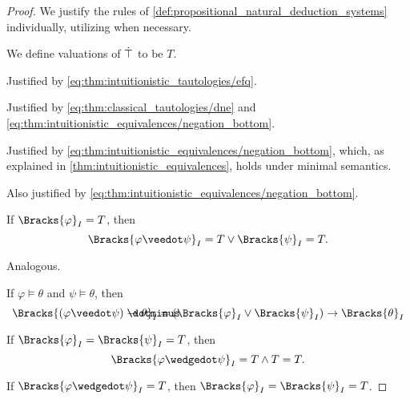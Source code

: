 \begin{proof}
  We justify the rules of \cref{def:propositional_natural_deduction_systems} individually, utilizing  when necessary.

   We define valuations of \( \dot{\top} \) to be \( T \).

   Justified by \eqref{eq:thm:intuitionistic_tautologies/efq}.

   Justified by \eqref{eq:thm:classical_tautologies/dne} and \eqref{eq:thm:intuitionistic_equivalences/negation_bottom}.

   Justified by \eqref{eq:thm:intuitionistic_equivalences/negation_bottom}, which, as explained in \cref{thm:intuitionistic_equivalences}, holds under minimal semantics.

   Also justified by \eqref{eq:thm:intuitionistic_equivalences/negation_bottom}.

   If \( \Bracks{\varphi}_I = T \), then
  \begin{equation*}
    \Bracks{\varphi \synvee \psi}_I = T \vee \Bracks{\psi}_I = T.
  \end{equation*}

   Analogous.

   If \( \varphi \vDash \theta \) and \( \psi \vDash \theta \), then
  \begin{equation*}
    \Bracks{(\varphi \synvee \psi) \synimplies \theta}_I
    =
    (\Bracks{\varphi}_I \vee \Bracks{\psi}_I) \rightarrow \Bracks{\theta}_I
  \end{equation*}

   If \( \Bracks{\varphi}_I = \Bracks{\psi}_I = T \), then
  \begin{equation*}
    \Bracks{\varphi \synwedge \psi}_I = T \wedge T = T.
  \end{equation*}

   If \( \Bracks{\varphi \synwedge \psi}_I = T \), then \( \Bracks{\varphi}_I = \Bracks{\psi}_I = T \).


\end{proof}
